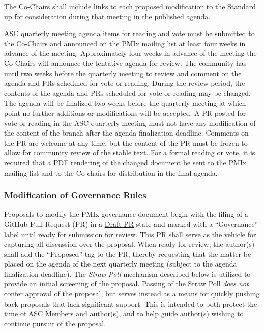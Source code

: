 \documentclass{article}
\begin{document}
The Co-Chairs shall include links to each proposed modification to the
Standard up for consideration during that meeting in the published
agenda.

ASC quarterly meeting agenda items for reading and vote must be submitted to the Co-Chairs
and announced on the PMIx mailing list at least four weeks in advance of the meeting. Approximately four weeks in advance of
the meeting the Co-Chairs will announce the tentative agenda for review.
The community has until two weeks before the quarterly meeting to review and comment on
the agenda and PRs scheduled for vote or reading. During the review period, the contents of the agenda and PRs scheduled for vote or reading may be changed. The agenda will be finalized two weeks before the quarterly
meeting at which point no further additions or modifications will be accepted.
A PR posted for vote or reading in the ASC quarterly meeting must not have
any modification of the content of the branch after the agenda finalization
deadline. Comments on the PR are welcome at any time, but the content of the
PR must be frozen to allow for community review of the stable text. For a
formal reading or vote, it is required that a PDF rendering of the changed document
be sent to the PMIx mailing list and to the Co-chairs for distribution in the final agenda.

\hypertarget{modification-of-governance-rules}{%
\subsubsection{Modification of Governance Rules}\label{modification-of-governance-rules}}

Proposals to modify the PMIx governance document begin with the filing
of a GitHub Pull Request (PR) in a
\href{https://github.blog/2019-02-14-introducing-draft-pull-requests/}{Draft
PR} state and marked with a ``Governance'' label until ready for
submission for review. This PR shall serve as the vehicle for capturing
all discussion over the proposal. When ready for review, the author(s)
shall add the ``Proposed'' tag to the PR, thereby requesting that the
matter be placed on the agenda of the next quarterly meeting (subject to
the agenda finalization deadline). The \textit{Straw Poll} mechanism described
below is utilized to provide an initial screening of the proposal.
Passing of the Straw Poll \emph{does not} confer approval of the
proposal, but serves instead as a means for quickly pushing back
proposals that lack significant support. This is intended to both
protect the time of ASC Members and author(s), and to help guide
author(s) wishing to continue pursuit of the proposal.
\end{document}
